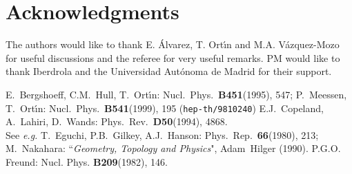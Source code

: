 \documentclass[a4paper,11pt]{article}
\begin{document}
\section*{Acknowledgments}
The authors would like to thank E. \'Alvarez, T. Ort\'{\i}n
and M.A. V\'azquez-Mozo for
useful discussions and the referee for very useful remarks.
PM would like to thank Iberdrola and the Universidad
Aut\'onoma de Madrid for their support.
\begin{thebibliography}{1}
%
%
 E.~Bergshoeff, C.M.~Hull, T.~Ort\'{\i}n:
        Nucl.~Phys.~{\bf B451}(1995), 547;
        P.~Meessen, T.~Ort\'{\i}n:
        Nucl.~Phys.~{\bf B541}(1999), 195 ({\tt hep-th/9810240})
%
%
%
 E.J.~Copeland, A.~Lahiri, D.~Wands:
        Phys.~Rev.~{\bf D50}(1994), 4868.\\
%
 See {\em e.g.} T.~Eguchi, P.B.~Gilkey, A.J.~Hanson:
        Phys.~Rep.~{\bf 66}(1980), 213;
        M.~Nakahara:
        ``{\em Geometry, Topology and Physics}",
        Adam~Hilger (1990).
%
%
 P.G.O. Freund:
        Nucl. Phys. {\bf B209}(1982), 146.
%

\end{thebibliography}
\end{document}
